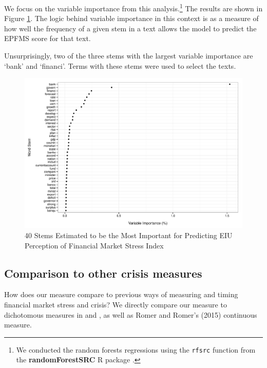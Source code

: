 \documentclass[]{article}
\begin{document}
We focus on the variable importance from this analysis.\footnote{We conducted the random forests regressions using the \texttt{rfsrc} function from the
\textbf{randomForestSRC} R package \citep{randomForestSRCCite}.} The results are shown in Figure \ref{rf_importance}. The logic behind variable importance in this context is as a measure of how well the frequency of a given stem in a text allows the model to predict the EPFMS score for that text.

Unsurprisingly, two of the three stems with the largest variable importance are `bank' and `financi'. Terms with these stems were used to select the texts.
\begin{figure}
    \caption{40 Stems Estimated to be the Most Important for Predicting EIU Perception of Financial Market Stress Index}
    \label{rf_importance}

    \begin{center}
        \includegraphics[scale=0.5]{analysis/figures/rf_stem_importance.pdf}
    \end{center}

\end{figure}

\subsection{Comparison to other crisis
measures}\label{comparison-to-other-crisis-measures}

How does our measure compare to previous ways of measuring and timing
financial market stress and crisis? We directly compare our measure to
dichotomous measures in \cite{Reinhart2009} and \cite{laeven2013}, as well as Romer and Romer's (2015) continuous measure.
\end{document}
